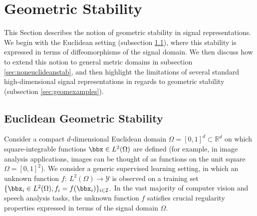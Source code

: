 \section{Geometric Stability}
\label{sec:geometry}

This Section describes the notion of geometric stability in signal representations. We begin with the Euclidean setting (subsection \ref{sec:euclideangeom}), where this stability is expressed in terms of diffeomorphisms of the signal domain. We then discuss how to extend this notion to general metric domains in subsection \ref{sec:noneuclideanstab}, and then highlight the limitations of several standard high-dimensional signal representations in regards to geometric stability (subsection \ref{sec:geomexamples}). 



\subsection{Euclidean Geometric Stability}
\label{sec:euclideangeom}
Consider a compact $d$-dimensional Euclidean domain $\Omega = [0,1]^d \subset \mathbb{R}^d$ on which  
square-integrable functions $\bbx\in L^2(\Omega)$ are defined (for example, in image analysis applications, images can be thought of as functions on the unit square $\Omega = [0,1]^2$). 
%
We consider a generic supervised learning setting, in which an unknown function 
$f : ~ L^2(\Omega) \to \mathcal{Y}$ is observed on a training set 
$\{ \bbx_i \in L^2(\Omega), f_i = f(\bbx_i) \}_{i \in \mathcal{I}}.$ 
%
In the vast majority of computer vision and speech analysis tasks, 
the unknown function $f$ satisfies crucial regularity properties 
expressed in terms of the signal domain $\Omega$.
%

